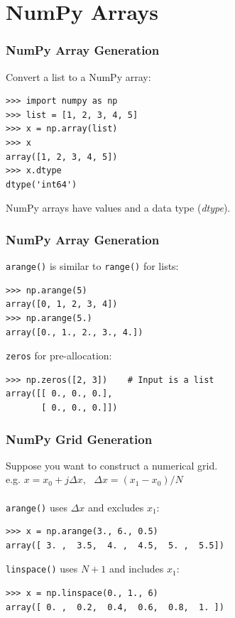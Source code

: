 \documentclass[red]{beamer}
\begin{document}
\section[Arrays]{NumPy Arrays}
\begin{frame}[fragile]
    \frametitle{NumPy Array Generation}

    Convert a list to a NumPy array:
    \begin{lstlisting}
>>> import numpy as np
>>> list = [1, 2, 3, 4, 5]
>>> x = np.array(list)
>>> x
array([1, 2, 3, 4, 5])
>>> x.dtype
dtype('int64')
    \end{lstlisting}
    NumPy arrays have values and a data type (\textit{dtype}).
\end{frame}
\begin{frame}[fragile]
    \frametitle{NumPy Array Generation}

    \lstinline|arange()| is similar to \lstinline|range()| for lists:
    \begin{lstlisting}
>>> np.arange(5)
array([0, 1, 2, 3, 4])
>>> np.arange(5.)
array([0., 1., 2., 3., 4.])
    \end{lstlisting}
    
    \lstinline|zeros| for pre-allocation:
    \begin{lstlisting}
>>> np.zeros([2, 3])    # Input is a list
array([[ 0., 0., 0.],
       [ 0., 0., 0.]])
    \end{lstlisting}
\end{frame}
\begin{frame}[fragile]
    \frametitle{NumPy Grid Generation}
   
    Suppose you want to construct a numerical grid.\\
    e.g. $x = x_0 + j \Delta x$, \ $\Delta x = (x_1 - x_0) / N$
    \\~\\
    \lstinline|arange()| uses $\Delta x$ and excludes $x_1$:
    \begin{lstlisting}
>>> x = np.arange(3., 6., 0.5)
array([ 3. ,  3.5,  4. ,  4.5,  5. ,  5.5])
    \end{lstlisting}
    \lstinline|linspace()| uses $N+1$ and includes $x_1$:
    \begin{lstlisting}
>>> x = np.linspace(0., 1., 6)
array([ 0. ,  0.2,  0.4,  0.6,  0.8,  1. ])
    \end{lstlisting}
\end{frame}
\end{document}
